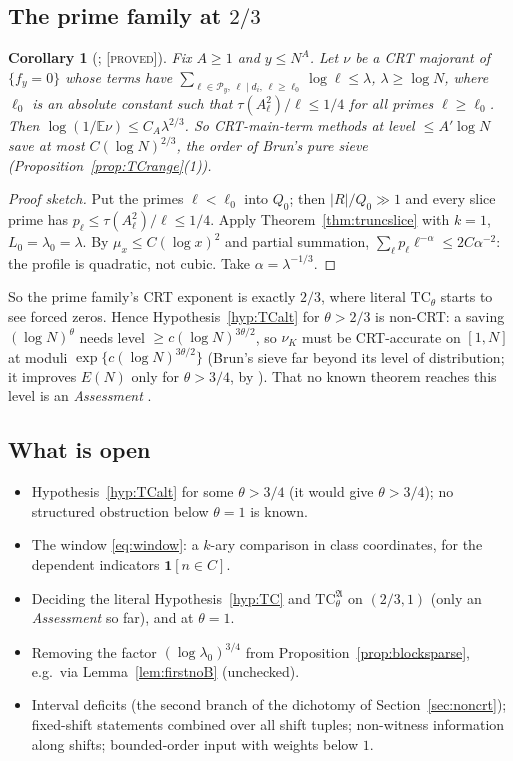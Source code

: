 \documentclass[10pt,reqno]{amsart}
\newtheorem{corollary}[theorem]{Corollary}
\theoremstyle{definition}
\theoremstyle{remark}
\newcommand{\cP}{\mathcal P}
\newcommand{\E}{\mathbb E}
\newcommand{\ind}{\mathbf 1}
\newcommand{\lab}[1]{\textup{[\textsc{#1}]}}
\begin{document}
\subsection{The prime family at \texorpdfstring{$2/3$}{2/3}}
\begin{corollary}[{\cite[Cor.~6.1]{TU2}}; \lab{proved}]\label{cor:prime23}
Fix $A\geq1$ and $y\leq N^A$.  Let $\nu$ be a CRT majorant of $\{f_y=0\}$ whose
terms have $\sum_{\ell\in\cP_y,\,\ell\mid d_i,\,\ell\geq\ell_0}\log\ell\leq\lambda$, $\lambda\geq\log N$, where $\ell_0$ is an
absolute constant such that $\tau(A_\ell^2)/\ell\leq1/4$ for all primes $\ell\geq\ell_0$.  Then
$\log(1/\E\nu)\leq C_A\lambda^{2/3}$.  So CRT-main-term methods at level
$\leq A'\log N$ save at most $C(\log N)^{2/3}$, the order of Brun's pure sieve
(Proposition~\ref{prop:TCrange}(1)).
\end{corollary}
\begin{proof}[Proof sketch]
Put the primes $\ell<\ell_0$ into $Q_0$; then $|R|/Q_0\gg1$ and every slice prime
has $p_\ell\leq\tau(A_\ell^2)/\ell\leq1/4$.  Apply Theorem~\ref{thm:truncslice} with $k=1$,
$L_0=\lambda_0=\lambda$.  By $\mu_x\leq C(\log x)^2$ and partial summation,
$\sum_\ell p_\ell\ell^{-\alpha}\leq2C\alpha^{-2}$: the profile is quadratic, not cubic.  Take
$\alpha=\lambda^{-1/3}$.
\end{proof}
So the prime family's CRT exponent is exactly $2/3$, where literal
$\mathrm{TC}_\theta$ starts to see forced zeros.  Hence Hypothesis~\ref{hyp:TCalt} for
$\theta>2/3$ is non-CRT: a saving $(\log N)^\theta$ needs level $\geq c(\log N)^{3\theta/2}$, so
$\nu_K$ must be CRT-accurate on $[1,N]$ at moduli $\exp\{c(\log N)^{3\theta/2}\}$ (Brun's
sieve far beyond its level of distribution; it improves $E(N)$ only for
$\theta>3/4$, by \cite{TQ}).  That no known theorem reaches this level is an
\emph{Assessment} \cite[Ass.~6.2]{TU2}.

\subsection{What is open}
\begin{itemize}
\item Hypothesis~\ref{hyp:TCalt} for some $\theta>3/4$ (it would give $\theta>3/4$); no
  structured obstruction below $\theta=1$ is known.
\item The window \eqref{eq:window}: a $k$-ary comparison in class
  coordinates, for the dependent indicators $\ind[n\in C]$.
\item Deciding the literal Hypothesis~\ref{hyp:TC} and
  $\mathrm{TC}^{\mathfrak A}_\theta$ on $(2/3,1)$ (only an \emph{Assessment} so far), and at
  $\theta=1$.
\item Removing the factor $(\log\lambda_0)^{3/4}$ from
  Proposition~\ref{prop:blocksparse}, e.g.\ via Lemma~\ref{lem:firstnoB}
  (unchecked).
\item Interval deficits (the second branch of the dichotomy of
  Section~\ref{sec:noncrt}); fixed-shift statements combined over all
  shift tuples; non-witness information along shifts; bounded-order
  input with weights below $1$.
\end{itemize}
\end{document}
